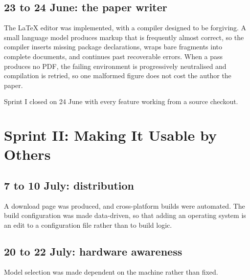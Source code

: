 \documentclass[11pt,a4paper]{article}
\begin{document}

\subsection{23 to 24 June: the paper writer}

The LaTeX editor was implemented, with a compiler designed to be forgiving. A
small language model produces markup that is frequently almost correct, so the
compiler inserts missing package declarations, wraps bare fragments into
complete documents, and continues past recoverable errors. When a pass produces
no PDF, the failing environment is progressively neutralised and compilation is
retried, so one malformed figure does not cost the author the paper.

Sprint I closed on 24 June with every feature working from a source checkout.

\section{Sprint II: Making It Usable by Others}

\subsection{7 to 10 July: distribution}

A download page was produced, and cross-platform builds were automated. The
build configuration was made data-driven, so that adding an operating system is
an edit to a configuration file rather than to build logic.

\subsection{20 to 22 July: hardware awareness}

Model selection was made dependent on the machine rather than fixed.

\end{document}
